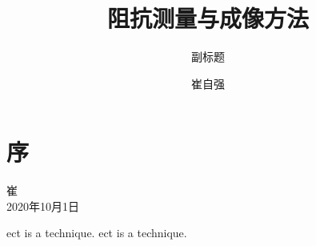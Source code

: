 \documentclass[cn,12pt,color=heda,chinesefont=macos,margintrue,toc=twocol,twoside,display,chinese]{etbook}
\title{阻抗测量与成像方法}
\subtitle{副标题}
\author{崔自强}
\institute{天津大学自动化学院}
\begin{document}
\maketitle
\frontmatter

\chapter*{序}




\vskip 1.5cm

\begin{flushright}
崔\\
2020年10月1日
\end{flushright}

\tableofcontents

\mainmatter

% 




\cite{Dashliborun2019a}


\gls{ect} is a technique. 
\gls{ect} is a technique. 

\glsaddall

\setlength{\glsdescwidth}{0.5\linewidth}
\setlength{\glspagelistwidth}{0.1\linewidth}



\printnoidxglossary[type=acronym,sort=letter]
\printnoidxglossary[type=symbols,sort=letter]



\end{document}
